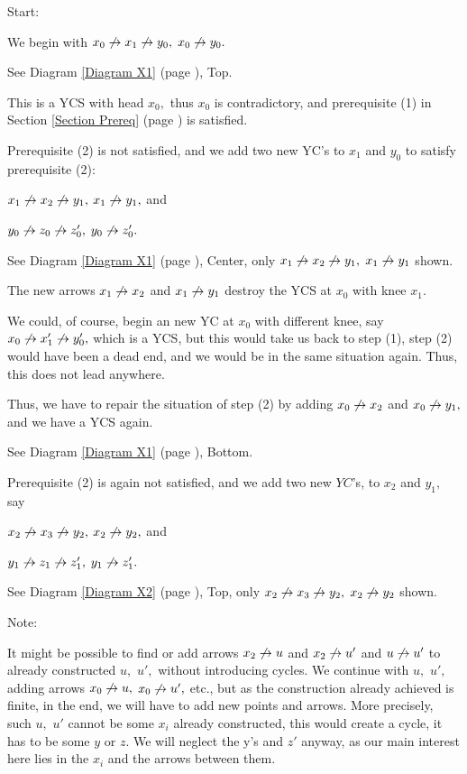 \label{Construction Details}

 \xEh

 \xDH
Start:

We begin with $x_{0} \not\rightarrow x_{1} \not\rightarrow y_{0},$ $x_{0} \not\rightarrow y_{0}.$

See Diagram \ref{Diagram X1} (page \pageref{Diagram X1}), Top.

This is a YCS with head $x_{0},$ thus $x_{0}$ is contradictory, and
prerequisite (1)
in Section \ref{Section Prereq} (page \pageref{Section Prereq})  is satisfied.

 \xDH
Prerequisite (2) is not satisfied, and we add two new YC's to $x_{1}$ and
$y_{0}$
to satisfy prerequisite (2):

$x_{1} \not\rightarrow x_{2} \not\rightarrow y_{1},$ $x_{1} \not\rightarrow y_{1},$ and

$y_{0} \not\rightarrow z_{0} \not\rightarrow z_{0}',$ $y_{0} \not\rightarrow z_{0}'.$

See Diagram \ref{Diagram X1} (page \pageref{Diagram X1}), Center, only
$x_{1} \not\rightarrow x_{2} \not\rightarrow y_{1},$ $x_{1} \not\rightarrow y_{1}$ shown.

 \xDH
The new arrows $x_{1} \not\rightarrow x_{2}$ and $x_{1} \not\rightarrow y_{1}$ destroy the YCS
at $x_{0}$ with knee $x_{1}.$

We could, of course, begin an new YC at $x_{0}$ with different knee, say
$x_{0} \not\rightarrow x_{1}' \not\rightarrow y_{0}',$ which is a YCS, but this would take us
back to step (1),
step (2) would have been a dead end, and we would be in the same
situation again. Thus, this does not lead anywhere.

Thus, we have to repair the situation of step (2) by adding
$x_{0} \not\rightarrow x_{2}$ and $x_{0} \not\rightarrow y_{1},$ and we have a YCS again.

See Diagram \ref{Diagram X1} (page \pageref{Diagram X1}), Bottom.

 \xDH
Prerequisite (2) is again not satisfied, and we add two new $YC$'s,
to $x_{2}$ and $y_{1},$ say

$x_{2} \not\rightarrow x_{3} \not\rightarrow y_{2},$ $x_{2} \not\rightarrow y_{2},$ and

$y_{1} \not\rightarrow z_{1} \not\rightarrow z_{1}',$ $y_{1} \not\rightarrow z_{1}'.$

See Diagram \ref{Diagram X2} (page \pageref{Diagram X2}), Top, only
$x_{2} \not\rightarrow x_{3} \not\rightarrow y_{2},$ $x_{2} \not\rightarrow y_{2}$ shown.

Note:

It might be possible to find or add arrows $x_{2} \not\rightarrow u$ and $x_{2} \not\rightarrow
u' $ and $u \not\rightarrow u' $
to already
constructed $u,$ $u',$ without introducing cycles. We continue with $u,$
$u',$
adding arrows $x_{0} \not\rightarrow u,$ $x_{0} \not\rightarrow u',$ etc., but as the
construction already
achieved is finite, in the end, we will have to add new points and arrows.
More precisely, such $u,$ $u' $ cannot be some $x_{i}$ already
constructed, this would
create a cycle, it has to be some $y$ or $z.$ We will neglect
the y's and $z' $ anyway, as our main
interest here lies in the $x_{i}$ and the arrows between them.

